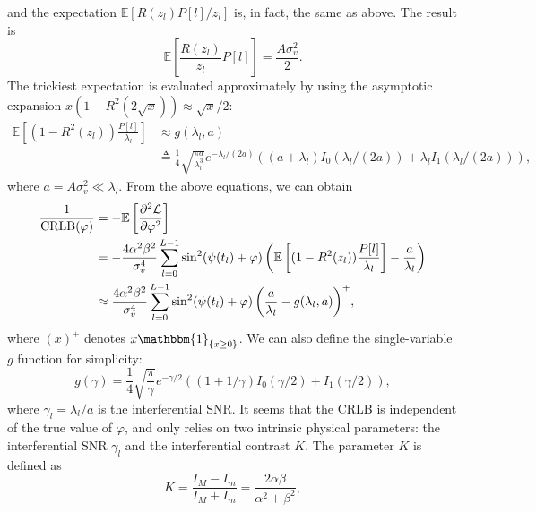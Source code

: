 \documentclass[12pt,draftclsnofoot,journal,onecolumn]{IEEEtran}
\theoremstyle{nonumberplain}
\begin{document}
    and the expectation $\mathbb{E}\left[R(z_l)P[l]/z_l\right]$ is, in fact, the same as above. The result is
    \begin{equation}
        \mathbb{E}\left[\frac{R(z_l)}{z_l} P[l]\right] = \frac{A\sigma_v^2}{2}.
    \end{equation}
    The trickiest expectation is evaluated approximately by using the asymptotic expansion $x(1-R^2(2\sqrt{x})) \approx \sqrt{x}/2$:
    \begin{equation}
        \begin{aligned}
            \mathbb{E}\left[(1-R^2(z_l))\frac{P[l]}{\lambda_l}\right] & \approx g(\lambda_l, a) \\ 
            & \triangleq  \frac{1}{4}\sqrt{\frac{\pi a}{\lambda_l^3}}e^{-\lambda_l/(2a)}\left((a+\lambda_l)I_0(\lambda_l/(2a))+\lambda_l I_1(\lambda_l/(2a))\right),
        \end{aligned}
    \end{equation}
    where $a=A\sigma_v^2 \ll \lambda_l$. From the above equations, we can obtain
    \begin{equation}
        \begin{aligned}
        \frac{1}{{\rm CRLB}(\varphi)} & = -\mathbb{E}\left[\frac{\partial^2\mathcal{L}}{\partial\varphi^2}\right] \\
        & =  -\frac{4\alpha^2\beta^2}{\sigma_v^4}\sum_{l=0}^{L-1}{ \sin^2(\psi(t_l)+\varphi) \left(\mathbb{E}\left[(1-R^2(z_l))\frac{P[l]}{\lambda_l}\right] - \frac{a}{\lambda_l}\right) } \\
        & \approx \frac{4\alpha^2\beta^2}{\sigma_v^4}\sum_{l=0}^{L-1}{ \sin^2(\psi(t_l)+\varphi) \left(\frac{a}{\lambda_l}-g(\lambda_l, a)\right)^{+} },
        \end{aligned}
        \label{eqn:CRLB}
    \end{equation}
    where $(x)^{+}$ denotes $x \mathbbm{1}_{\{x \ge 0\}}$. We can also define the single-variable $g$ function for simplicity:
    \begin{equation}
        g(\gamma) = \frac{1}{4} \sqrt{\frac{\pi}{\gamma}}e^{-\gamma/2}\left((1+1/\gamma)I_0(\gamma/2) + I_1(\gamma/2)\right),
    \end{equation}
    where $\gamma_l = \lambda_l / a$ is the interferential SNR. It seems that the CRLB is independent of the true value of $\varphi$, and only relies on two intrinsic physical parameters: the interferential SNR $\gamma_l$ and the interferential contrast $K$. The parameter $K$ is defined as 
    \begin{equation}
        K = \frac{I_M - I_m}{I_M + I_m} = \frac{2\alpha\beta}{\alpha^2+\beta^2},
    \end{equation}
\end{document}

